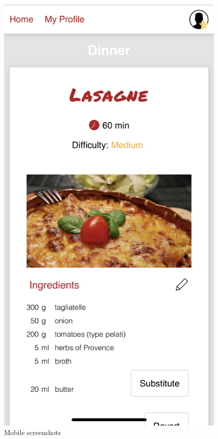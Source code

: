 \begin{figure}[htp]
		\includegraphics[scale=0.12]{Ressourcen/img/screenshots/iphone3.png}
	\caption{Mobile screenshots}
\end{figure}


